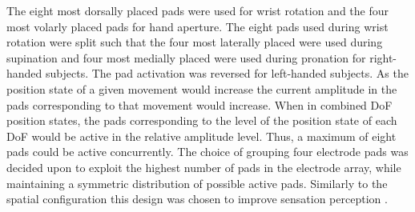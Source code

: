The eight most dorsally placed pads were used for wrist rotation and the four most volarly placed pads for hand aperture. The eight pads used during wrist rotation were split such that the four most laterally placed were used during supination and four most medially placed were used during pronation for right-handed subjects. The pad activation was reversed for left-handed subjects. As the position state of a given movement would increase the current amplitude in the pads corresponding to that movement would increase. When in combined DoF position states, the pads corresponding to the level of the position state of each DoF would be active in the relative amplitude level. Thus, a maximum of eight pads could be active concurrently. The choice of grouping four electrode pads was decided upon to exploit the highest number of pads in the electrode array, while maintaining a symmetric distribution of possible active pads. Similarly to the spatial configuration this design was chosen to improve sensation perception \cite{Dosen2015}.


